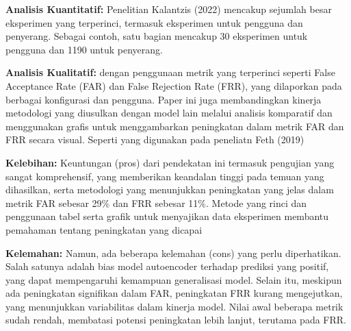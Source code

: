 \textbf{Analisis Kuantitatif:} Penelitian Kalantzis (2022) mencakup sejumlah besar eksperimen yang terperinci, termasuk eksperimen untuk pengguna dan penyerang. Sebagai contoh, satu bagian mencakup 30 eksperimen untuk pengguna dan 1190 untuk penyerang.

\textbf{Analisis Kualitatif:} dengan penggunaan metrik yang terperinci seperti False Acceptance Rate (FAR) dan False Rejection Rate (FRR), yang dilaporkan pada berbagai konfigurasi dan pengguna. Paper ini juga membandingkan kinerja metodologi yang diusulkan dengan model lain melalui analisis komparatif dan menggunakan grafis untuk menggambarkan peningkatan dalam metrik FAR dan FRR secara visual. Seperti yang digunakan pada peneliatn Feth (2019)

\textbf{Kelebihan:} Keuntungan (pros) dari pendekatan ini termasuk pengujian yang sangat komprehensif, yang memberikan keandalan tinggi pada temuan yang dihasilkan, serta metodologi yang menunjukkan peningkatan yang jelas dalam metrik FAR sebesar 29\% dan FRR sebesar 11\%. Metode yang rinci dan penggunaan tabel serta grafik untuk menyajikan data eksperimen membantu pemahaman tentang peningkatan yang dicapai

\textbf{Kelemahan:} Namun, ada beberapa kelemahan (cons) yang perlu diperhatikan. Salah satunya adalah bias model autoencoder terhadap prediksi yang positif, yang dapat mempengaruhi kemampuan generalisasi model. Selain itu, meskipun ada peningkatan signifikan dalam FAR, peningkatan FRR kurang mengejutkan, yang menunjukkan variabilitas dalam kinerja model. Nilai awal beberapa metrik sudah rendah, membatasi potensi peningkatan lebih lanjut, terutama pada FRR.
